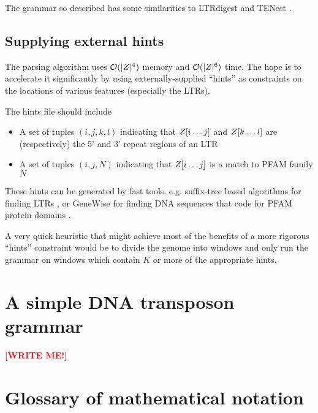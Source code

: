 \documentclass[10pt]{article}
\newcommand{\seclabel}[1]{\label{sec:#1}}
\newcommand\redpen[1]{{\bf \textcolor{red}{#1}} \textcolor{black}{}}
\newcommand\writeme{\redpen{\bf [WRITE ME!]}}
\begin{document}
The grammar so described has some similarities to LTRdigest \cite{pmid19786494} and TENest \cite{KronmillerWise2008}.


\subsection{Supplying external hints}

The parsing algorithm uses ${\cal O}(|Z|^4)$ memory and ${\cal O}(|Z|^6)$ time.
The hope is to accelerate it significantly by using externally-supplied ``hints''
as constraints on the locations of various features (especially the LTRs).

The hints file should include
\begin{itemize}
\item A set of tuples $(i,j,k,l)$ indicating that $Z[i \ldots j]$ and $Z[k \ldots l]$ are (respectively) the 5' and 3' repeat regions of an LTR
\item A set of tuples $(i,j,N)$ indicating that $Z[i \ldots j]$ is a match to PFAM family $N$
\end{itemize}

These hints can be generated by fast tools, e.g. suffix-tree based algorithms for finding LTRs \cite{pmid16819780},
or GeneWise for finding DNA sequences that code for PFAM protein domains \cite{BirneyEtAl04}.

A very quick heuristic that might achieve most of the benefits of a more rigorous ``hints'' constraint
would be to divide the genome into windows and only run the grammar on windows which contain $K$ or more of the appropriate hints.

\section{A simple DNA transposon grammar}
\seclabel{TransposonGrammar}

\writeme

\section{Glossary of mathematical notation}
\end{document}
